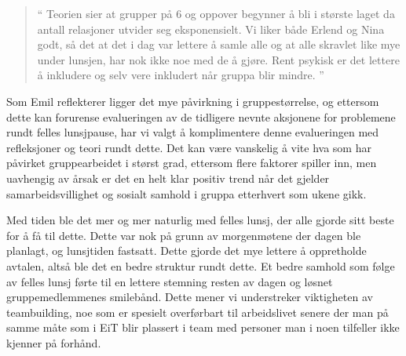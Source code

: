 \begin{quote}``
Teorien sier at grupper på 6 og oppover begynner å bli i største laget da antall relasjoner utvider seg eksponensielt. Vi liker både Erlend og Nina godt, så det at det i dag var lettere å samle alle og at alle skravlet like mye under lunsjen, har nok ikke noe med de å gjøre. Rent psykisk er det lettere å inkludere og selv vere inkludert når gruppa blir mindre.
''\end{quote} 

Som Emil reflekterer ligger det mye påvirkning i gruppestørrelse, og ettersom dette kan forurense evalueringen av de tidligere nevnte aksjonene for problemene rundt felles lunsjpause, har vi valgt å komplimentere denne evalueringen med refleksjoner og teori rundt dette. Det kan være vanskelig å vite hva som har påvirket gruppearbeidet i størst grad, ettersom flere faktorer spiller inn, men uavhengig av årsak er det en helt klar positiv trend når det gjelder samarbeidsvillighet og sosialt samhold i gruppa etterhvert som ukene gikk.

Med tiden ble det mer og mer naturlig med felles lunsj, der alle gjorde sitt beste for å få til dette. Dette var nok på grunn av morgenmøtene der dagen ble planlagt, og lunsjtiden fastsatt. Dette gjorde det mye lettere å oppretholde avtalen, altså ble det en bedre struktur rundt dette. Et bedre samhold som følge av felles lunsj førte til en lettere stemning resten av dagen og løsnet gruppemedlemmenes smilebånd. Dette mener vi understreker viktigheten av teambuilding, noe som er spesielt overførbart til arbeidslivet senere der man på samme måte som i EiT blir plassert i team med personer man i noen tilfeller ikke kjenner på forhånd. 